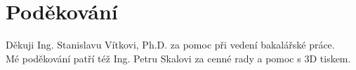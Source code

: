 
\vspace*{\fill}
\section*{Poděkování}
Děkuji Ing. Stanislavu Vítkovi, Ph.D. za pomoc při vedení bakalářské práce. \\
\noindent
Mé poděkování patří též Ing. Petru Skalovi za cenné rady a pomoc s 3D tiskem.

